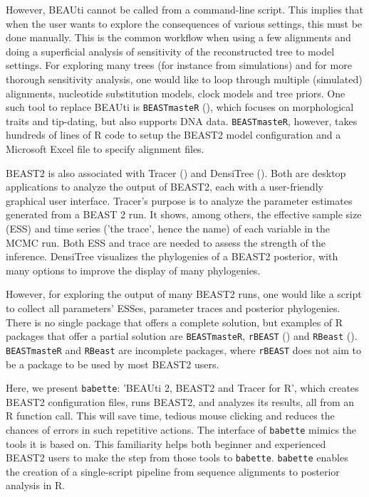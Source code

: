 \documentclass{article}
\begin{document}
However, BEAUti cannot be called from a command-line script.
This implies that when the user 
wants to explore the consequences of various settings, this must be done manually.
This is the common workflow when using a few alignments and doing a superficial 
analysis of sensitivity of the reconstructed tree to model settings. 
For exploring many trees (for instance from simulations) and for
more thorough sensitivity analysis, one would like to loop through 
multiple (simulated) alignments, nucleotide substitution models, 
clock models and tree priors. 
One such tool to replace BEAUti is \verb;BEASTmasteR; (\cite{beastmaster}),
which focuses on morphological traits and tip-dating, but also 
supports DNA data. \verb;BEASTmasteR;, however, takes hundreds of
lines of R code to setup the BEAST2 model configuration 
and a Microsoft Excel file to specify alignment files.

BEAST2 is also associated with Tracer (\cite{tracer}) and 
DensiTree (\cite{DensiTree}). Both are desktop applications 
to analyze the output of BEAST2, each with a user-friendly graphical user interface. 
Tracer's purpose is to analyze the parameter estimates generated
from a BEAST 2 run. It shows, among
others, the effective sample size (ESS) and time series ('the trace', 
hence the name) of each variable in the MCMC run. Both ESS and trace
are needed to assess the strength of the inference. 
DensiTree visualizes the phylogenies of a BEAST2 posterior, with
many options to improve the display of many phylogenies.

However, for exploring the output of many BEAST2 runs, 
one would like a script to collect all parameters' ESSes,
parameter traces and posterior phylogenies.
There is no single package that offers a complete solution,
but examples of R packages that offer a partial solution
are \verb;BEASTmasteR;, \verb;rBEAST; 
(\cite{rBEAST_ratmann}) and 
\verb;RBeast; (\cite{RBeast_faria}). 
\verb;BEASTmasteR; and \verb;RBeast; are incomplete
packages, where \verb;rBEAST; does not aim to be a 
package to be used by most BEAST2 users.

Here, we present \verb;babette;:
’BEAUti 2, BEAST2 and Tracer for R’, 
which creates BEAST2 configuration files,
runs BEAST2, and analyzes its results,
all from an R function call. This
will save time, tedious mouse clicking and 
reduces the chances of errors in such repetitive actions.
The interface of \verb;babette; mimics the tools it
is based on. This
familiarity helps both beginner and experienced BEAST2 users 
to make the step from those tools to \verb;babette;.
\verb;babette; enables the creation of a single-script 
pipeline from sequence alignments to posterior analysis in R. 
\end{document}
